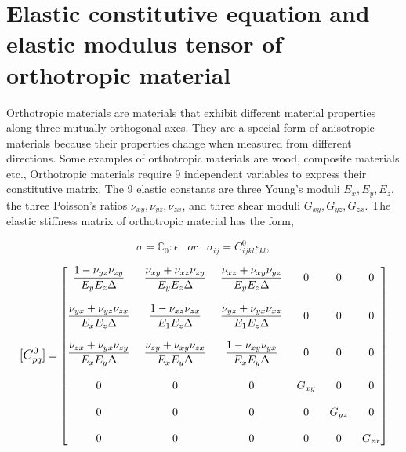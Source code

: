 \documentclass[12pt]{report}
\begin{document}
\section{Elastic constitutive equation and elastic modulus tensor of orthotropic material}\label{Constitutive matrix}
\indent\indent\indent Orthotropic materials are materials that exhibit different material properties along three mutually orthogonal axes. They are a special form of anisotropic materials because their properties change when measured from different directions. Some examples of orthotropic materials are wood, composite materials etc., Orthotropic materials require 9 independent variables to express their constitutive matrix. The 9 elastic constants are three Young's moduli $E_{x},E_{y},E_{z}$, the three Poisson's ratios $\nu_{xy},\nu_{yz},\nu_{zx}$, and three shear moduli $G_{xy},G_{yz},G_{zx}$. The elastic stiffness matrix of orthotropic material has the form,

\begin{equation}
  \sigma = \mathbb{C}_{0} : \epsilon \;\;\;   or \;\;\;  \sigma_{ij}  =  C^{0}_{ijkl}\epsilon_{kl},
\end{equation}

$$
\mathlarger{ [C^{0}_{pq}]} =  
 \begin{bmatrix}
 \mathlarger{ \frac{1 - \nu_{yz}\nu_{zy}}{E_{y}E_{z}\Delta} } \;&  \mathlarger{  \frac{\nu_{xy} + \nu_{xz}\nu_{zy}}{E_{y}E_{z}\Delta}}   \;& \mathlarger{  \frac{\nu_{xz} + \nu_{xy}\nu_{yz}}{E_{y}E_{z}\Delta} }  \;&  \mathlarger{  0}  \;&  \mathlarger{ 0}  \;& \mathlarger{  0}  \\
 \\
    \mathlarger{ \frac{\nu_{yx} + \nu_{yz}\nu_{zx}}{E_{x}E_{z}\Delta} }  \;& \mathlarger{  \frac{1 - \nu_{xz}\nu_{zx}}{E_{1}E_{z}\Delta} }\; & \mathlarger{ \frac{\nu_{yz} +\nu_{yx}\nu_{xz}}{E_{1}E_{z}\Delta} } \; & \mathlarger{ 0}\; &\mathlarger{  0}\; & \mathlarger{ 0}\\
  \\
   \mathlarger{  \frac{\nu_{zx} + \nu_{yx}\nu_{zy}}{E_{x}E_{y}\Delta}}  \;& \mathlarger{   \frac{\nu_{zy} + \nu_{xy}\nu_{zx}}{E_{x}E_{y}\Delta} }\;&\mathlarger{  \frac{1 - \nu_{xy}\nu_{yx}}{E_{x}E_{y}\Delta} } \;&\mathlarger{  0 }\;& \mathlarger{ 0 }\;&\mathlarger{  0} \\ 
\\

 
 \mathlarger{  0} \;&  \mathlarger{  0 } \;&  \mathlarger{  0 }\;&\mathlarger{ G_{xy}} \;& \mathlarger{0} \;& \mathlarger{0} \\
  \\
 \mathlarger{ 0} \;&  \mathlarger{  0 }\;&  \mathlarger{  0 } \;& \mathlarger{0 }\;& \mathlarger{ G_{yz} }\;&\mathlarger{ 0} \\
  \\
  \mathlarger{0}\;&  \mathlarger{  0 } \;&  \mathlarger{  0 } \;& \mathlarger{0 }\;& \mathlarger{0} \;& \mathlarger{G_{zx}} 
 \end{bmatrix}
 $$\\
 
\end{document}
